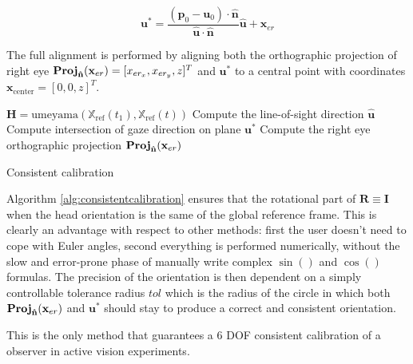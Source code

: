 \documentclass[acmtocl,acmnow]{acmtrans2m}
\newcommand{\proj}{\textrm{\textbf{Proj}} }
\begin{document}
\begin{equation}\label{eq:gazedirectionintersection}
      \mathbf{u}^{*} = \frac{(\mathbf{p}_0-\mathbf{u}_0) \cdot \mathbf{\hat{n}}}{\mathbf{\hat{u}}\cdot \hat{\mathbf{n}}} \mathbf{\hat{u}} + \mathbf{x}_{er}
\end{equation}


The full alignment is performed by aligning both the orthographic projection of right eye $\proj_{\mathbf{\hat{n}}} ({\mathbf{x}_{er} }) =  [ x_{er_x}, x_{er_y}, z ]^T$ and $\mathbf{u}^{*}$ 
to a central point with coordinates $\mathbf{x}_{\textrm{center}}=\left[ 0,0,z\right]^T$.

\begin{algorithm}[htb]\label{alg:consistentcalibration}
{
\While{ $|| \proj_{\mathbf{\hat{n}}}({\mathbf{x}_{er} }) - \mathbf{x}_{\textrm{center}} || > \epsilon$ and  $||
\mathbf{u}^{*} - \mathbf{x}_{\textrm{center}}) || > \epsilon$ }
{
$
\mathbf{H} = \textrm{umeyama}\left( \mathbb{X}_{\textrm{ref}}(t_1),
\mathbb{X}_{\textrm{ref}}(t) \right)
$\;
Compute the line-of-sight direction $\mathbf{\hat{u}}$   \;
Compute intersection of gaze direction on plane  $\mathbf{u}^{*}$  \;
Compute the right eye orthographic projection $\proj_{\mathbf{\hat{n}}} ({\mathbf{x}_{er} })$   \;
}
}
\caption{Consistent calibration}
\end{algorithm}

Algorithm \ref{alg:consistentcalibration} ensures that the rotational part of $\mathbf{R}\equiv \mathbf{I}$ when the head orientation is the same of the global reference frame.
This is clearly an advantage with respect to other methods: first the user doesn't need to cope with Euler angles, second everything is performed numerically, without the slow and error-prone
phase of manually write complex $\sin()$ and $\cos()$ formulas. The precision of the orientation is then dependent on a simply controllable tolerance radius $tol$ which is the radius of the
circle in which both $\proj_{\mathbf{\hat{n}}}({\mathbf{x}_{er} })$ and $\mathbf{u}^{*}$ should stay to produce a correct and consistent orientation.

This is the only method that guarantees a 6 DOF consistent calibration of a observer in active vision experiments.
\end{document}
